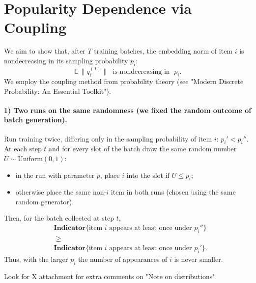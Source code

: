 \section{Popularity Dependence via Coupling}
\label{app:popularity-dependence}

We aim to show that, after $T$ training batches, the embedding norm of item $i$ is nondecreasing in its sampling probability $p_i$:
\begin{equation}
\mathbb E\,\bigl\|q_i^{(T)}\bigr\| \;\text{ is nondecreasing in }\; p_i.
\end{equation}
We employ the coupling method from probability theory (see "Modern Discrete Probability: An Essential Toolkit").

\paragraph{1) Two runs on the same randomness (we fixed the random outcome of batch generation).}
Run training twice, differing only in the sampling probability of item $i$: $p_i' < p_i''$. At each step $t$ and for every slot of the batch draw the same random number $U \sim \mathrm{Uniform}(0,1)$:
\begin{itemize}
  \item in the run with parameter $p$, place $i$ into the slot if $U \le p_i$;
  \item otherwise place the same non-$i$ item in both runs (chosen using the same random generator).
\end{itemize}
Then, for the batch collected at step $t$,
\begin{equation}
\begin{aligned}
&\mathbf{Indicator}\{\text{item } i \text{ appears at least once under } p_i''\} \\
&\;\ge\; \\
&\mathbf{Indicator}\{\text{item } i \text{ appears at least once under } p_i'\}.
\end{aligned}
\end{equation}
Thus, with the larger $p_i$ the number of appearances of $i$ is never smaller.

Look for X attachment for extra comments on "Note on distributions".

